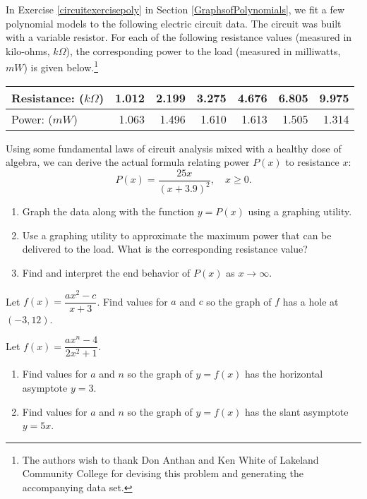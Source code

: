 \documentclass{ximera}
\begin{document}
\begin{problem}
In Exercise \ref{circuitexercisepoly} in Section \ref{GraphsofPolynomials}, we fit a few polynomial models to the following electric circuit data. The circuit was built with a variable resistor.  For each of the following resistance values (measured in kilo-ohms, $k \Omega$),  the corresponding power to the load (measured in milliwatts, $mW$) is given below.\footnote{The authors wish to thank Don Anthan and Ken White of Lakeland Community College for devising this problem and generating the accompanying data set.}

\begin{tabular}{|l|r|r|r|r|r|r|} \hline
Resistance: ($k \Omega$) & 1.012 & 2.199 & 3.275 & 4.676 & 6.805 & 9.975 \\ \hline
Power: ($mW$) & 1.063 & 1.496 & 1.610 & 1.613 & 1.505 & 1.314 \\ \hline
\end{tabular}

\noindent Using some fundamental laws of circuit analysis mixed with a healthy dose of algebra, we can derive the actual formula relating power $P(x)$ to resistance $x$:   \[P(x) = \frac{25x}{(x + 3.9)^2}, \quad x \geq 0.\]

\begin{enumerate}

\item Graph the data along with the function $y = P(x)$ using a graphing utility.

\item Use a graphing utility to approximate the maximum power that can be delivered to the load.  What is the corresponding resistance value?

\item Find and interpret the end behavior of $P(x)$ as $x \rightarrow \infty$.

\end{enumerate}
\end{problem}

\begin{problem}
Let $f(x) = \dfrac{ax^2-c}{x+3}$.  Find values  for $a$ and  $c$ so  the graph of $f$ has a hole  at $(-3, 12)$.
\end{problem}

\begin{problem}
Let $f(x) = \dfrac{ax^{n} -4}{2x^2+1}$.

\begin{enumerate}

\item  Find values for $a$ and $n$ so the graph of $y = f(x)$  has the horizontal asymptote $y = 3$.

\item  Find values for $a$ and $n$ so the graph of  $y=f(x)$ has the slant asymptote $y = 5x$.

\end{enumerate}
\end{problem}
\end{document}
